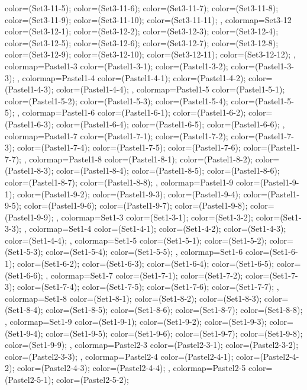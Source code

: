 {{color=(Set3-11-5);
color=(Set3-11-6);
color=(Set3-11-7);
color=(Set3-11-8);
color=(Set3-11-9);
color=(Set3-11-10);
color=(Set3-11-11);
},
colormap={Set3-12}{
color=(Set3-12-1);
color=(Set3-12-2);
color=(Set3-12-3);
color=(Set3-12-4);
color=(Set3-12-5);
color=(Set3-12-6);
color=(Set3-12-7);
color=(Set3-12-8);
color=(Set3-12-9);
color=(Set3-12-10);
color=(Set3-12-11);
color=(Set3-12-12);
},
colormap={Pastel1-3}{
color=(Pastel1-3-1);
color=(Pastel1-3-2);
color=(Pastel1-3-3);
},
colormap={Pastel1-4}{
color=(Pastel1-4-1);
color=(Pastel1-4-2);
color=(Pastel1-4-3);
color=(Pastel1-4-4);
},
colormap={Pastel1-5}{
color=(Pastel1-5-1);
color=(Pastel1-5-2);
color=(Pastel1-5-3);
color=(Pastel1-5-4);
color=(Pastel1-5-5);
},
colormap={Pastel1-6}{
color=(Pastel1-6-1);
color=(Pastel1-6-2);
color=(Pastel1-6-3);
color=(Pastel1-6-4);
color=(Pastel1-6-5);
color=(Pastel1-6-6);
},
colormap={Pastel1-7}{
color=(Pastel1-7-1);
color=(Pastel1-7-2);
color=(Pastel1-7-3);
color=(Pastel1-7-4);
color=(Pastel1-7-5);
color=(Pastel1-7-6);
color=(Pastel1-7-7);
},
colormap={Pastel1-8}{
color=(Pastel1-8-1);
color=(Pastel1-8-2);
color=(Pastel1-8-3);
color=(Pastel1-8-4);
color=(Pastel1-8-5);
color=(Pastel1-8-6);
color=(Pastel1-8-7);
color=(Pastel1-8-8);
},
colormap={Pastel1-9}{
color=(Pastel1-9-1);
color=(Pastel1-9-2);
color=(Pastel1-9-3);
color=(Pastel1-9-4);
color=(Pastel1-9-5);
color=(Pastel1-9-6);
color=(Pastel1-9-7);
color=(Pastel1-9-8);
color=(Pastel1-9-9);
},
colormap={Set1-3}{
color=(Set1-3-1);
color=(Set1-3-2);
color=(Set1-3-3);
},
colormap={Set1-4}{
color=(Set1-4-1);
color=(Set1-4-2);
color=(Set1-4-3);
color=(Set1-4-4);
},
colormap={Set1-5}{
color=(Set1-5-1);
color=(Set1-5-2);
color=(Set1-5-3);
color=(Set1-5-4);
color=(Set1-5-5);
},
colormap={Set1-6}{
color=(Set1-6-1);
color=(Set1-6-2);
color=(Set1-6-3);
color=(Set1-6-4);
color=(Set1-6-5);
color=(Set1-6-6);
},
colormap={Set1-7}{
color=(Set1-7-1);
color=(Set1-7-2);
color=(Set1-7-3);
color=(Set1-7-4);
color=(Set1-7-5);
color=(Set1-7-6);
color=(Set1-7-7);
},
colormap={Set1-8}{
color=(Set1-8-1);
color=(Set1-8-2);
color=(Set1-8-3);
color=(Set1-8-4);
color=(Set1-8-5);
color=(Set1-8-6);
color=(Set1-8-7);
color=(Set1-8-8);
},
colormap={Set1-9}{
color=(Set1-9-1);
color=(Set1-9-2);
color=(Set1-9-3);
color=(Set1-9-4);
color=(Set1-9-5);
color=(Set1-9-6);
color=(Set1-9-7);
color=(Set1-9-8);
color=(Set1-9-9);
},
colormap={Pastel2-3}{
color=(Pastel2-3-1);
color=(Pastel2-3-2);
color=(Pastel2-3-3);
},
colormap={Pastel2-4}{
color=(Pastel2-4-1);
color=(Pastel2-4-2);
color=(Pastel2-4-3);
color=(Pastel2-4-4);
},
colormap={Pastel2-5}{
color=(Pastel2-5-1);
color=(Pastel2-5-2);
}}
